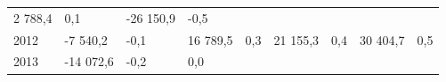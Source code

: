 \begin{longtable}[]{@{}lllllllll@{}}
\begin{minipage}[t]{0.12\columnwidth}
2 788,4\strut
\end{minipage} & \begin{minipage}[t]{0.06\columnwidth}\raggedright
0,1\strut
\end{minipage} & \begin{minipage}[t]{0.08\columnwidth}\raggedright
-26 150,9\strut
\end{minipage} & \begin{minipage}[t]{0.06\columnwidth}\raggedright
-0,5\strut
\end{minipage}\tabularnewline
\begin{minipage}[t]{0.05\columnwidth}\raggedright
2012\strut
\end{minipage} & \begin{minipage}[t]{0.10\columnwidth}\raggedright
-7 540,2\strut
\end{minipage} & \begin{minipage}[t]{0.06\columnwidth}\raggedright
-0,1\strut
\end{minipage} & \begin{minipage}[t]{0.17\columnwidth}\raggedright
16 789,5\strut
\end{minipage} & \begin{minipage}[t]{0.06\columnwidth}\raggedright
0,3\strut
\end{minipage} & \begin{minipage}[t]{0.12\columnwidth}\raggedright
21 155,3\strut
\end{minipage} & \begin{minipage}[t]{0.06\columnwidth}\raggedright
0,4\strut
\end{minipage} & \begin{minipage}[t]{0.08\columnwidth}\raggedright
30 404,7\strut
\end{minipage} & \begin{minipage}[t]{0.06\columnwidth}\raggedright
0,5\strut
\end{minipage}\tabularnewline
\begin{minipage}[t]{0.05\columnwidth}\raggedright
2013\strut
\end{minipage} & \begin{minipage}[t]{0.10\columnwidth}\raggedright
-14 072,6\strut
\end{minipage} & \begin{minipage}[t]{0.06\columnwidth}\raggedright
-0,2\strut
\end{minipage} & \begin{minipage}[t]{0.17\columnwidth}\raggedright
0,0\strut
\end{minipage} & \begin{minipage}[t]{0.06\columnwidth}\raggedright

\end{minipage}
\end{longtable}
